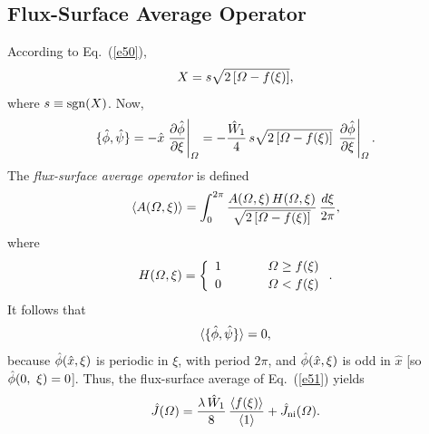 \documentclass[12pt,prb,aps]{revtex4-1}
\begin{document}
\subsection{Flux-Surface Average Operator}
According to Eq.~(\ref{e50}), 
\begin{equation}
X = s\sqrt{2\left[{\mit\Omega}-f(\xi)\right]},
\end{equation}
where $s\equiv {\rm sgn}(X)$. Now,
\begin{equation}
 \{\skew{3}\hat{\phi},\hat{\psi}\} = -\hat{x}\left.\frac{\partial\hat{\phi}}{\partial\xi}\right|_{\mit\Omega}= -\frac{\hat{W}_1}{4}\,
 s\sqrt{2\left[{\mit\Omega}-f(\xi)\right]}\,\left.\frac{\partial\hat{\phi}}{\partial\xi}\right|_{\mit\Omega}.
 \end{equation}
 The {\em flux-surface average operator} is defined
 \begin{equation}\label{e54}
 \langle A({\mit\Omega},\xi)\rangle= \int_{0}^{2\pi}\frac{A({\mit\Omega},\xi)\,H({\mit\Omega},\xi)}
 {\sqrt{2\left[{\mit\Omega}-f(\xi)\right]}}\,\frac{d\xi}{2\pi},
 \end{equation}
 where
 \begin{equation}\label{e55}
 H({\mit\Omega},\xi) = \left\{
 \begin{array}{ccc} 1&~~~~~&{\mit\Omega}\geq f(\xi)\\[0.5ex]
 0 &&{\mit\Omega}< f(\xi)\end{array}\right..
 \end{equation}
 It follows that
 \begin{equation}
 \langle \{\skew{3}\hat{\phi},\hat{\psi}\}\rangle = 0,
 \end{equation}
 because $\skew{3}\hat{\phi}(\hat{x},\xi)$ is periodic in $\xi$, with period $2\pi$, and $\skew{3}\hat{\phi}(\hat{x},\xi)$
 is odd in $\hat{x}$ [so $\skew{3}\hat{\phi}(0,\
 \xi)=0$]. Thus, the flux-surface average of Eq.~(\ref{e51}) yields
 \begin{equation}\label{e57}
 \hat{J}({\mit\Omega}) = \frac{\lambda\,\hat{W}_1}{8}\,\frac{\langle f(\xi)\rangle}{\langle 1\rangle} + \hat{J}_{\rm ni}({\mit\Omega}).
 \end{equation}
\end{document}

